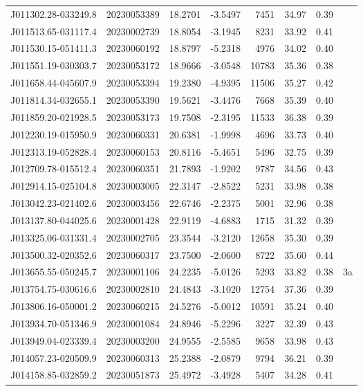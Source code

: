 \documentclass{article}
\begin{document}
\begin {longtable}{|l|l|r|r|r|r|r|l|}
 J011302.28-033249.8&  20230053389&   18.2701&   -3.5497&  7451& 34.97& 0.39&\\
 J011513.65-031117.4&  20230002739&   18.8054&   -3.1945&  8231& 33.92& 0.41&\\
 J011530.15-051411.3&  20230060192&   18.8797&   -5.2318&  4976& 34.02& 0.40&\\
 J011551.19-030303.7&  20230053172&   18.9666&   -3.0548& 10783& 35.36& 0.38&\\
 J011658.44-045607.9&  20230053394&   19.2380&   -4.9395& 11506& 35.27& 0.42&\\
 J011814.34-032655.1&  20230053390&   19.5621&   -3.4476&  7668& 35.39& 0.40&\\
 J011859.20-021928.5&  20230053173&   19.7508&   -2.3195& 11533& 36.38& 0.39&\\
 J012230.19-015950.9&  20230060331&   20.6381&   -1.9998&  4696& 33.73& 0.40&\\
 J012313.19-052828.4&  20230060153&   20.8116&   -5.4651&  5496& 32.75& 0.39&\\
 J012709.78-015512.4&  20230060351&   21.7893&   -1.9202&  9787& 34.56& 0.43&\\
 J012914.15-025104.8&  20230003005&   22.3147&   -2.8522&  5231& 33.98& 0.38&\\
 J013042.23-021402.6&  20230003456&   22.6746&   -2.2375&  5001& 32.96& 0.38&\\
 J013137.80-044025.6&  20230001428&   22.9119&   -4.6883&  1715& 31.32& 0.39&\\
 J013325.06-031331.4&  20230002705&   23.3544&   -3.2120& 12658& 35.30& 0.39&\\
 J013500.32-020352.6&  20230060317&   23.7500&   -2.0600&  8722& 35.60& 0.44&\\
 J013655.55-050245.7&  20230001106&   24.2235&   -5.0126&  5293& 33.82& 0.38&3a\\%
 J013754.75-030616.6&  20230002810&   24.4843&   -3.1020& 12754& 37.36& 0.39&\\
 J013806.16-050001.2&  20230060215&   24.5276&   -5.0012& 10591& 35.24& 0.40&\\
 J013934.70-051346.9&  20230001084&   24.8946&   -5.2296&  3227& 32.39& 0.43&\\
 J013949.04-023339.4&  20230003200&   24.9555&   -2.5585&  9658& 33.98& 0.43&\\
 J014057.23-020509.9&  20230060313&   25.2388&   -2.0879&  9794& 36.21& 0.39&\\
 J014158.85-032859.2&  20230051873&   25.4972&   -3.4928&  5407& 34.28& 0.41&\\

\end{longtable}
\end{document}
